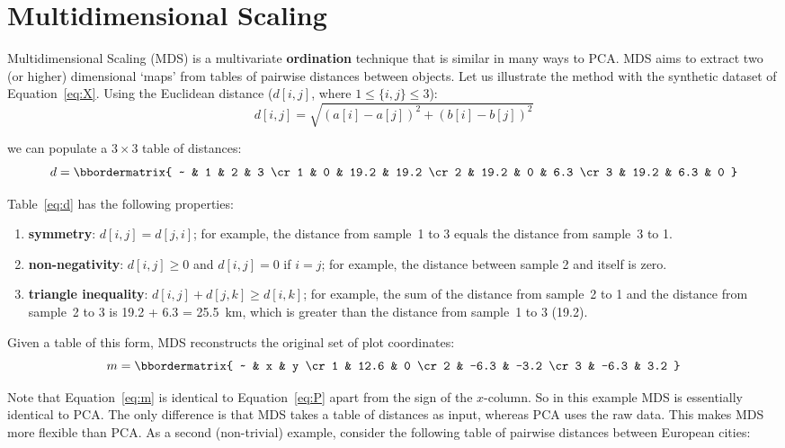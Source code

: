 \section{Multidimensional Scaling}
\label{sec:MDS}

Multidimensional Scaling (MDS) is a multivariate \textbf{ordination}
technique that is similar in many ways to PCA. MDS aims to extract two
(or higher) dimensional `maps' from tables of pairwise distances
between objects. Let us illustrate the method with the synthetic
dataset of Equation~\ref{eq:X}. Using the Euclidean distance
($d[i,j]$, where $1\leq\{i,j\}\leq{3}$):
\begin{equation}
  d[i,j] = \sqrt{(a[i]-a[j])^2 + (b[i]-b[j])^2}
  \label{eq:euclidean}
\end{equation}

\noindent we can populate a ${3}\times{3}$ table of distances:
\begin{equation}
  d = \bbordermatrix{
    ~ & 1    & 2    & 3 \cr
    1 & 0    & 19.2 & 19.2 \cr
    2 & 19.2 & 0    & 6.3 \cr
    3 & 19.2 & 6.3  & 0
  }
  \label{eq:d}
\end{equation}

Table~\ref{eq:d} has the following properties:

\begin{enumerate}
\item{\bf symmetry}: $d[i,j]=d[j,i]$; for example, the distance from
  sample~1 to 3 equals the distance from sample~3 to 1.
\item{\bf non-negativity}: $d[i,j]\geq{0}$ and $d[i,j]=0$ if $i=j$;
  for example, the distance between sample 2 and itself is zero.
\item{\bf triangle inequality}: $d[i,j]+d[j,k]\geq{d[i,k]}$; for
  example, the sum of the distance from sample~2 to 1 and the distance
  from sample~2 to 3 is 19.2 + 6.3 = 25.5~km, which is greater than
  the distance from sample~1 to 3 (19.2).
\end{enumerate}

Given a table of this form, MDS reconstructs the original set of plot
coordinates:
\begin{equation}
  m = \bbordermatrix{
    ~ & x    & y \cr
    1 & 12.6 &  0 \cr
    2 & -6.3 & -3.2 \cr
    3 & -6.3 &  3.2 
  }
  \label{eq:m}
\end{equation}

Note that Equation~\ref{eq:m} is identical to Equation~\ref{eq:P}
apart from the sign of the $x$-column.  So in this example MDS is
essentially identical to PCA. The only difference is that MDS takes a
table of distances as input, whereas PCA uses the raw data. This makes
MDS more flexible than PCA. As a second (non-trivial) example,
consider the following table of pairwise distances between European
cities:

